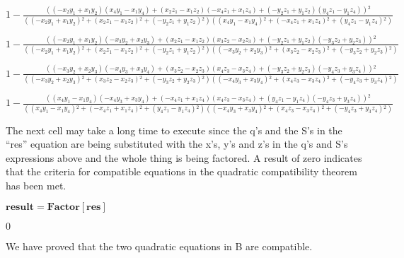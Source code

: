 \documentclass{article}
\begin{document}
\begin{doublespace}
\noindent\(1-\frac{\left(\left(-x_2 y_1+x_1 y_2\right) \left(x_4 y_1-x_1 y_4\right)+\left(x_2 z_1-x_1 z_2\right) \left(-x_4 z_1+x_1 z_4\right)+\left(-y_2
z_1+y_1 z_2\right) \left(y_4 z_1-y_1 z_4\right)\right){}^2}{\left(\left(-x_2 y_1+x_1 y_2\right){}^2+\left(x_2 z_1-x_1 z_2\right){}^2+\left(-y_2 z_1+y_1
z_2\right){}^2\right) \left(\left(x_4 y_1-x_1 y_4\right){}^2+\left(-x_4 z_1+x_1 z_4\right){}^2+\left(y_4 z_1-y_1 z_4\right){}^2\right)}\)
\end{doublespace}

\begin{doublespace}
\noindent\(1-\frac{\left(\left(-x_2 y_1+x_1 y_2\right) \left(-x_3 y_2+x_2 y_3\right)+\left(x_2 z_1-x_1 z_2\right) \left(x_3 z_2-x_2 z_3\right)+\left(-y_2
z_1+y_1 z_2\right) \left(-y_3 z_2+y_2 z_3\right)\right){}^2}{\left(\left(-x_2 y_1+x_1 y_2\right){}^2+\left(x_2 z_1-x_1 z_2\right){}^2+\left(-y_2
z_1+y_1 z_2\right){}^2\right) \left(\left(-x_3 y_2+x_2 y_3\right){}^2+\left(x_3 z_2-x_2 z_3\right){}^2+\left(-y_3 z_2+y_2 z_3\right){}^2\right)}\)
\end{doublespace}

\begin{doublespace}
\noindent\(1-\frac{\left(\left(-x_3 y_2+x_2 y_3\right) \left(-x_4 y_3+x_3 y_4\right)+\left(x_3 z_2-x_2 z_3\right) \left(x_4 z_3-x_3 z_4\right)+\left(-y_3
z_2+y_2 z_3\right) \left(-y_4 z_3+y_3 z_4\right)\right){}^2}{\left(\left(-x_3 y_2+x_2 y_3\right){}^2+\left(x_3 z_2-x_2 z_3\right){}^2+\left(-y_3
z_2+y_2 z_3\right){}^2\right) \left(\left(-x_4 y_3+x_3 y_4\right){}^2+\left(x_4 z_3-x_3 z_4\right){}^2+\left(-y_4 z_3+y_3 z_4\right){}^2\right)}\)
\end{doublespace}

\begin{doublespace}
\noindent\(1-\frac{\left(\left(x_4 y_1-x_1 y_4\right) \left(-x_4 y_3+x_3 y_4\right)+\left(-x_4 z_1+x_1 z_4\right) \left(x_4 z_3-x_3 z_4\right)+\left(y_4
z_1-y_1 z_4\right) \left(-y_4 z_3+y_3 z_4\right)\right){}^2}{\left(\left(x_4 y_1-x_1 y_4\right){}^2+\left(-x_4 z_1+x_1 z_4\right){}^2+\left(y_4 z_1-y_1
z_4\right){}^2\right) \left(\left(-x_4 y_3+x_3 y_4\right){}^2+\left(x_4 z_3-x_3 z_4\right){}^2+\left(-y_4 z_3+y_3 z_4\right){}^2\right)}\)
\end{doublespace}

The next cell may take a long time to execute since the q{'}s and the S{'}s in the {``}res{''} equation are being substituted with the x{'}s, y{'}s
and z{'}s in the q{'}s and S{'}s expressions above and the whole thing is being factored. A result of zero indicates that the criteria for compatible
equations in the quadratic compatibility theorem has been met.

\begin{doublespace}
\noindent\(\pmb{\text{result} = \text{Factor}[\text{res}]}\)
\end{doublespace}

\begin{doublespace}
\noindent\(0\)
\end{doublespace}

We have proved that the two quadratic equations in B are compatible.
\end{document}
